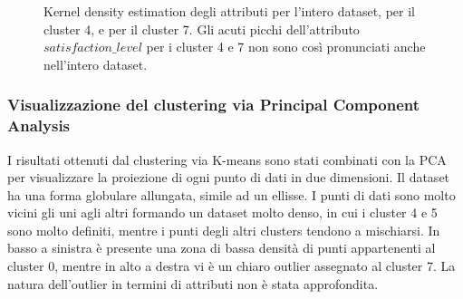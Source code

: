 \documentclass[10pt,a4paper,twocolumn]{article}
\begin{document}
\begin{figure}%
    \centering
    \caption{Kernel density estimation degli attributi 
    		\protect{} per l'intero dataset, 
    		\protect{} per il cluster 4, e
    		\protect{} per il cluster 7. Gli acuti picchi dell'attributo $satisfaction\_level$ per i cluster 4 e 7 non sono così pronunciati anche nell'intero dataset.}%
    \label{fig:kde_clusters}%
\end{figure}

\subsubsection{Visualizzazione del clustering via Principal Component Analysis}
I risultati ottenuti dal clustering via K-means sono stati combinati con la PCA per visualizzare la proiezione di ogni punto di dati in due dimensioni. Il dataset ha una forma globulare allungata, simile ad un ellisse. I punti di dati sono molto vicini gli uni agli altri formando un dataset molto denso, in cui i cluster 4 e 5 sono molto definiti, mentre i punti degli altri clusters tendono a mischiarsi. In basso a sinistra è presente una zona di bassa densità di punti appartenenti al cluster 0, mentre in alto a destra vi è un chiaro outlier assegnato al cluster 7. La natura dell'outlier in termini di attributi non è stata approfondita.
\end{document}
